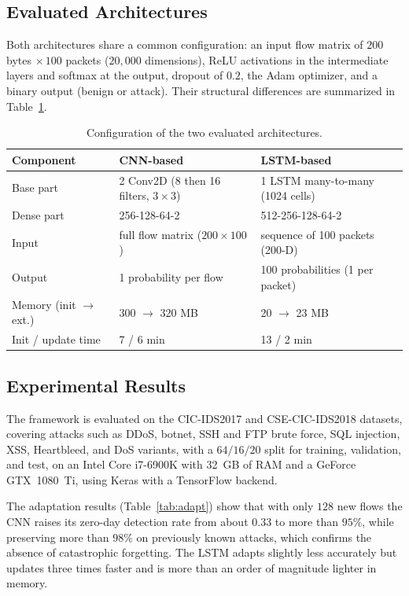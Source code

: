 \documentclass[11pt,a4paper]{article}
\begin{document}
\subsection{Evaluated Architectures}

Both architectures share a common configuration: an input flow matrix of $200$ bytes $\times\,100$ packets ($20{,}000$ dimensions), ReLU activations in the intermediate layers and softmax at the output, dropout of $0.2$, the Adam optimizer, and a binary output (benign or attack). Their structural differences are summarized in Table~\ref{tab:arch}.

\begin{table}[h]
\centering
\caption{Configuration of the two evaluated architectures.}
\label{tab:arch}
\small
\begin{tabular}{@{}lll@{}}
\toprule
\textbf{Component} & \textbf{CNN-based} & \textbf{LSTM-based} \\
\midrule
Base part & 2 Conv2D (8 then 16 filters, $3{\times}3$) & 1 LSTM many-to-many (1024 cells) \\
Dense part & 256-128-64-2 & 512-256-128-64-2 \\
Input & full flow matrix ($200{\times}100$) & sequence of 100 packets (200-D) \\
Output & 1 probability per flow & 100 probabilities (1 per packet) \\
Memory (init $\to$ ext.) & 300 $\to$ 320 MB & 20 $\to$ 23 MB \\
Init / update time & 7 / 6 min & 13 / 2 min \\
\bottomrule
\end{tabular}
\end{table}

\subsection{Experimental Results}

The framework is evaluated on the CIC-IDS2017 and CSE-CIC-IDS2018 datasets, covering attacks such as DDoS, botnet, SSH and FTP brute force, SQL injection, XSS, Heartbleed, and DoS variants, with a $64/16/20$ split for training, validation, and test, on an Intel Core i7-6900K with 32~GB of RAM and a GeForce GTX~1080~Ti, using Keras with a TensorFlow backend.

The adaptation results (Table~\ref{tab:adapt}) show that with only $128$ new flows the CNN raises its zero-day detection rate from about $0.33$ to more than $95\%$, while preserving more than $98\%$ on previously known attacks, which confirms the absence of catastrophic forgetting. The LSTM adapts slightly less accurately but updates three times faster and is more than an order of magnitude lighter in memory.
\end{document}
